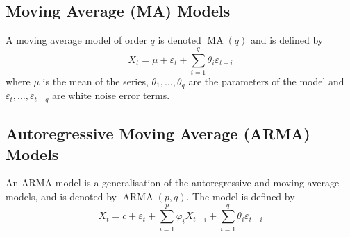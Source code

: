 \documentclass[11pt]{report} %
\begin{document}
\subsection{Moving Average (MA) Models}
A moving average model of order $q$ is denoted $\operatorname{MA}\left(q\right)$ and is defined by
\begin{equation}
X_{t} = \mu + \varepsilon_{t} + \sum_{i = 1}^{q}\theta_{i}\varepsilon_{t - i}
\end{equation}
where $\mu$ is the mean of the series, $\theta_{1}, \dots, \theta_{q}$ are the parameters of the model and $\varepsilon_{t}, \dots, \varepsilon_{t - q}$ are white noise error terms.

\subsection{Autoregressive Moving Average (ARMA) Models}
An ARMA model is a generalisation of the autoregressive and moving average models, and is denoted by $\operatorname{ARMA}\left(p, q\right)$. The model is defined by
\begin{equation}
X_{t} = c + \varepsilon_{t} + \sum_{i = 1}^{p}\varphi_{i}X_{t - i} + \sum_{i = 1}^{q}\theta_{i}\varepsilon_{t - i}
\end{equation}
\end{document}
